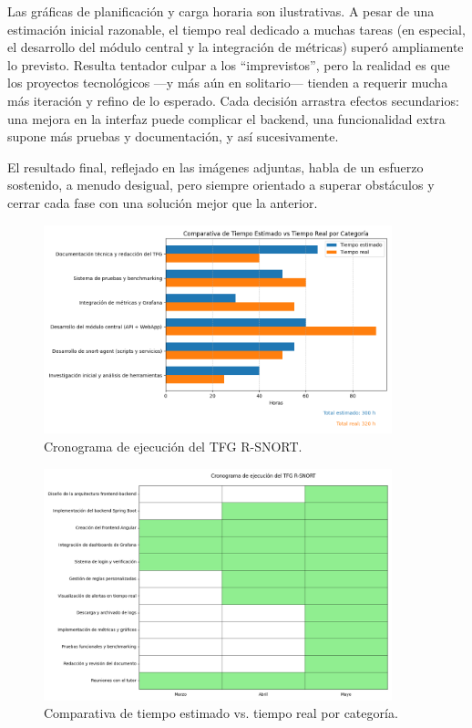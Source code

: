 \documentclass[11pt,a4paper,twoside]{report}
\begin{document}
Las gráficas de planificación y carga horaria son ilustrativas. A pesar de una estimación inicial razonable, el tiempo real dedicado a muchas tareas (en especial, el desarrollo del módulo central y la integración de métricas) superó ampliamente lo previsto. Resulta tentador culpar a los “imprevistos”, pero la realidad es que los proyectos tecnológicos —y más aún en solitario— tienden a requerir mucha más iteración y refino de lo esperado. Cada decisión arrastra efectos secundarios: una mejora en la interfaz puede complicar el backend, una funcionalidad extra supone más pruebas y documentación, y así sucesivamente.\newline

El resultado final, reflejado en las imágenes adjuntas, habla de un esfuerzo sostenido, a menudo desigual, pero siempre orientado a superar obstáculos y cerrar cada fase con una solución mejor que la anterior.

\begin{figure}[H]
	\centering
	\includegraphics[width=0.90\textwidth]{cronologia/1.png}
	\caption{Cronograma de ejecución del TFG R-SNORT.}
\end{figure}

\begin{figure}[H]
	\centering
	\includegraphics[width=0.90\textwidth]{cronologia/2.png}
	\caption{Comparativa de tiempo estimado vs. tiempo real por categoría.}
\end{figure}
\end{document}
